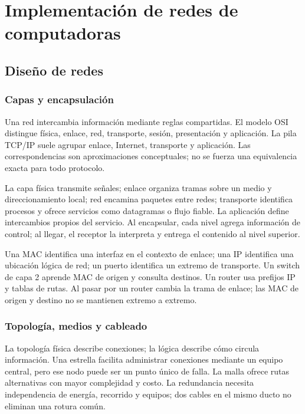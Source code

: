 \chapter{Implementación de redes de computadoras}
\section{Diseño de redes}\label{sec:r1}
\subsection{Capas y encapsulación}
Una red intercambia información mediante reglas compartidas. El modelo OSI distingue física, enlace, red, transporte, sesión, presentación y aplicación. La pila TCP/IP suele agrupar enlace, Internet, transporte y aplicación. Las correspondencias son aproximaciones conceptuales; no se fuerza una equivalencia exacta para todo protocolo.

La capa física transmite señales; enlace organiza tramas sobre un medio y direccionamiento local; red encamina paquetes entre redes; transporte identifica procesos y ofrece servicios como datagramas o flujo fiable. La aplicación define intercambios propios del servicio. Al encapsular, cada nivel agrega información de control; al llegar, el receptor la interpreta y entrega el contenido al nivel superior.

Una MAC identifica una interfaz en el contexto de enlace; una IP identifica una ubicación lógica de red; un puerto identifica un extremo de transporte. Un switch de capa 2 aprende MAC de origen y consulta destinos. Un router usa prefijos IP y tablas de rutas. Al pasar por un router cambia la trama de enlace; las MAC de origen y destino no se mantienen extremo a extremo.

\subsection{Topología, medios y cableado}
La topología física describe conexiones; la lógica describe cómo circula información. Una estrella facilita administrar conexiones mediante un equipo central, pero ese nodo puede ser un punto único de falla. La malla ofrece rutas alternativas con mayor complejidad y costo. La redundancia necesita independencia de energía, recorrido y equipos; dos cables en el mismo ducto no eliminan una rotura común.

